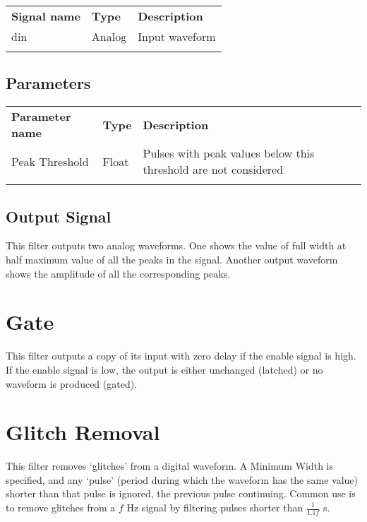 \begin{tabularx}{16cm}{llX}
\thickhline
\textbf{Signal name} & \textbf{Type} & \textbf{Description} \\
\thickhline
din & Analog & Input waveform \\
\thickhline
\end{tabularx}

\subsection{Parameters}

\begin{tabularx}{16cm}{llX}
\thickhline
\textbf{Parameter name} & \textbf{Type} & \textbf{Description} \\
\thickhline
Peak Threshold & Float & Pulses with peak values below this threshold are not considered\\
\thickhline
\end{tabularx}

\subsection{Output Signal}

This filter outputs two analog waveforms. One shows the value of full width at half maximum value of all the peaks in the signal.
Another output waveform shows the amplitude of all the corresponding peaks.

\pagebreak
\section{Gate}

This filter outputs a copy of its input with zero delay if the enable signal is high. If the enable signal is low,
the output is either unchanged (latched) or no waveform is produced (gated).

\pagebreak
\section{Glitch Removal}

This filter removes `glitches' from a digital waveform. A Minimum Width is specified, and any `pulse' (period during which the waveform has the same value) shorter than that pulse is ignored, the previous pulse continuing. Common use is to remove glitches from a $f$ Hz signal by filtering pulses shorter than $\frac{1}{1.1f}$ s.

